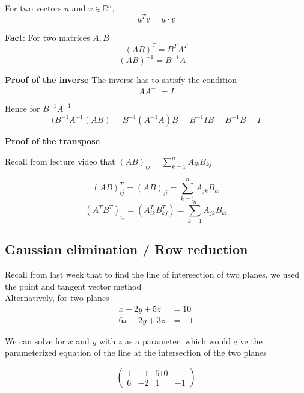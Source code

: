 \begin{framed}
   For two vectors $ \underline{u} \text{ and } \underline{v} \in \mathbb{R}^n$, \[
     \underline{u}^T \underline{v} = \underline{u} \cdot \underline{v}
   \] 
   
   \textbf{Fact}: For two matrices $A, B$
   \[
      \left( AB \right) ^T = B^T A^T 
   \] 
   \[
      \left( AB \right) ^{-1} = B^{-1}A^{-1}
   \] 

   \textbf{Proof of the inverse}
   The inverse has to satisfy the condition \[
      A A^{-1} = I
   \] 

   Hence for $B^{-1}A^{-1}$ \[
      (B^{-1}A^{-1}(AB) = B^{-1}(A^{-1}A)B = B^{-1}IB = B^{-1}B = I
   \] 

   \textbf{Proof of the transpose}

   Recall from lecture video that $ \left( AB \right)_{ij} = \sum_{k=1}^{n} A_{ik}B_{kj}$

   \[
      \left( AB \right)_{ij}^T = \left( AB \right)_{ji} = \sum_{k=1}^{n} A_{jk} B_{ki}
   \] 
   \[
      \left( A^T B^T \right)_{ij} = \left( A^T_{ik} B^T_{kj} \right) = \sum_{k=1}^{n} A_{jk} B_{ki}
   \] 
  
\end{framed}

\subsection{Gaussian elimination / Row reduction}

\begin{framed}
   Recall from last week that to find the line of intersection of two planes, we used the point and tangent vector method \\

   Alternatively, for two planes 
   \begin{align*}
      x - 2y + 5z &= 10 \\
      6x - 2y + 3z &= -1
   \end{align*}

   We can solve for $x$ and $y$ with $z$ as a parameter, which would give the parameterized equation of the line at the intersection of the two planes

  \[
    \begin{pmatrix} 
       1 & -1 & 5 10\\
       6 & -2 & 1 & -1
    \end{pmatrix}
  \]  
  
\end{framed}


